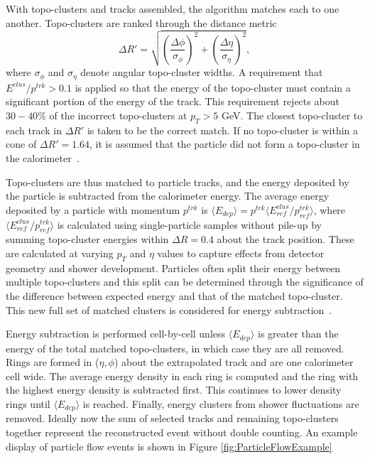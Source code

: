 With topo-clusters and tracks assembled, the algorithm matches each to one another. Topo-clusters are ranked through the distance metric 
\begin{equation}
\Delta R' = \sqrt{(\frac{\Delta \phi}{\sigma_\phi})^2+(\frac{\Delta \eta}{\sigma_\eta})^2},
\end{equation}
where $\sigma_\phi$ and $\sigma_\eta$ denote angular topo-cluster widths. A requirement that $E^{clus}/p^{trk}>0.1$ is applied so that the energy of the topo-cluster must contain a significant portion of the energy of the track. This requirement rejects about $30-40\%$ of the incorrect topo-clusters at $p_T>5$ GeV. The closest topo-cluster to each track in $\Delta R'$ is taken to be the correct match. If no topo-cluster is within a cone of $\Delta R'= 1.64$, it is assumed that the particle did not form a topo-cluster in the calorimeter~\cite{ParticleFlow}. 

Topo-clusters are thus matched to particle tracks, and the energy deposited by the particle is subtracted from the calorimeter energy. The average energy deposited by a particle with momentum $p^{trk}$ is $\langle E_{dep} \rangle=p^{trk}\langle E_{ref}^{clus}/p_{ref}^{trk}\rangle$, where $\langle E_{ref}^{clus}/p_{ref}^{trk} \rangle$ is calculated using single-particle samples without pile-up by summing topo-cluster energies within $\Delta R = 0.4$ about the track position. These are calculated at varying $p_T$ and $\eta$ values to capture effects from detector geometry and shower development. Particles often split their energy between multiple topo-clusters and this split can be determined through the significance of the difference between expected energy and that of the matched topo-cluster. This new full set of matched clusters is considered for energy subtraction~\cite{ParticleFlow}. 

Energy subtraction is performed cell-by-cell unless $\langle E_{dep} \rangle$ is greater than the energy of the total matched topo-clusters, in which case they are all removed. Rings are formed in ($\eta,\phi$) about the extrapolated track and are one calorimeter cell wide. The average energy density in each ring is computed and the ring with the highest energy density is subtracted first. This continues to lower density rings until $\langle E_{dep} \rangle$ is reached. Finally, energy clusters from shower fluctuations are removed. Ideally now the sum of selected tracks and remaining topo-clusters together represent the reconstructed event without double counting. An example display of particle flow events is shown in Figure \ref{fig:ParticleFlowExample}

